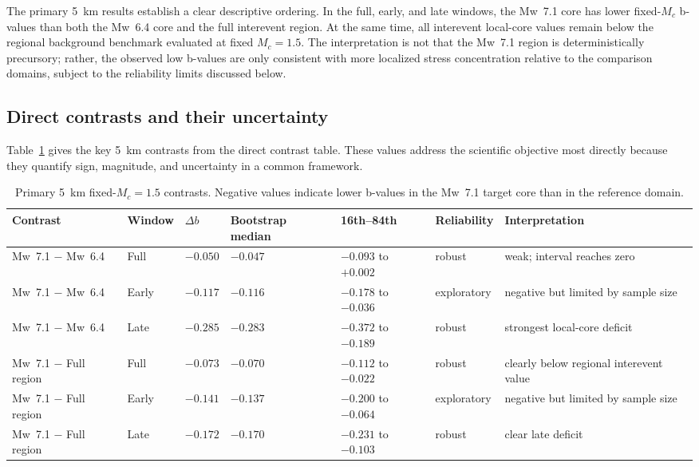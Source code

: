 \documentclass[11pt]{article}
\begin{document}
The primary 5~km results establish a clear descriptive ordering. In the full, early, and late windows, the Mw~7.1 core has lower fixed-$M_c$ b-values than both the Mw~6.4 core and the full interevent region. At the same time, all interevent local-core values remain below the regional background benchmark evaluated at fixed $M_c=1.5$. The interpretation is not that the Mw~7.1 region is deterministically precursory; rather, the observed low b-values are only consistent with more localized stress concentration relative to the comparison domains, subject to the reliability limits discussed below.

\subsection{Direct contrasts and their uncertainty}
Table~\ref{tab:contrasts} gives the key 5~km contrasts from the direct contrast table. These values address the scientific objective most directly because they quantify sign, magnitude, and uncertainty in a common framework.

\begin{table}[H]
\centering
\caption{Primary 5~km fixed-$M_c=1.5$ contrasts. Negative values indicate lower b-values in the Mw~7.1 target core than in the reference domain.}
\label{tab:contrasts}
\footnotesize
\setlength{\tabcolsep}{4pt}
\begin{tabular}{p{2.3cm}p{0.9cm}p{1.1cm}p{1.5cm}p{2.0cm}p{1.6cm}p{3.4cm}}
\toprule
Contrast & Window & $\Delta b$ & Bootstrap median & 16th--84th & Reliability & Interpretation \\
\midrule
Mw~7.1 $-$ Mw~6.4 & Full & $-0.050$ & $-0.047$ & $-0.093$ to $+0.002$ & robust & weak; interval reaches zero \\
Mw~7.1 $-$ Mw~6.4 & Early & $-0.117$ & $-0.116$ & $-0.178$ to $-0.036$ & exploratory & negative but limited by sample size \\
Mw~7.1 $-$ Mw~6.4 & Late & $-0.285$ & $-0.283$ & $-0.372$ to $-0.189$ & robust & strongest local-core deficit \\
Mw~7.1 $-$ Full region & Full & $-0.073$ & $-0.070$ & $-0.112$ to $-0.022$ & robust & clearly below regional interevent value \\
Mw~7.1 $-$ Full region & Early & $-0.141$ & $-0.137$ & $-0.200$ to $-0.064$ & exploratory & negative but limited by sample size \\
Mw~7.1 $-$ Full region & Late & $-0.172$ & $-0.170$ & $-0.231$ to $-0.103$ & robust & clear late deficit \\
\bottomrule
\end{tabular}
\normalsize
\setlength{\tabcolsep}{6pt}
\end{table}
\end{document}
